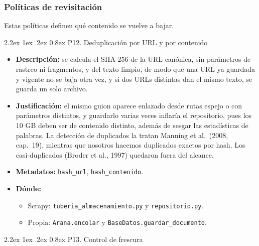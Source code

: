 \documentclass[11pt,spanish]{article}
\makeatletter
\renewcommand\paragraph{\@startsection{paragraph}{4}{\z@}%
  {2.2ex \@plus1ex \@minus.2ex}%
  {0.8ex}%
  {\normalfont\normalsize\bfseries}}
\makeatother
\begin{document}
\subsubsection{Políticas de revisitación}

Estas políticas definen qué contenido se vuelve a bajar.

\paragraph{P12. Deduplicación por URL y por contenido}

\begin{itemize}[label=\textbullet, leftmargin=*]
    \item \textbf{Descripción:} se calcula el SHA-256 de la URL canónica, sin parámetros de rastreo ni fragmentos, y del texto limpio, de modo que una URL ya guardada y vigente no se baja otra vez, y si dos URLs distintas dan el mismo texto, se guarda un solo archivo.
    \item \textbf{Justificación:} el mismo guion aparece enlazado desde rutas espejo o con parámetros distintos, y guardarlo varias veces inflaría el repositorio, pues los 10 GB deben ser de contenido distinto, además de sesgar las estadísticas de palabras. La detección de duplicados la tratan Manning et al.\ (2008, cap.\ 19), mientras que nosotros hacemos duplicados exactos por hash. Los casi-duplicados (Broder et al., 1997) quedaron fuera del alcance.
    \item \textbf{Metadatos:} \texttt{hash\_url}, \texttt{hash\_contenido}.
    \item \textbf{Dónde:}
    \begin{itemize}[label=--, leftmargin=*]
        \item Scrapy: \texttt{tuberia\_almacenamiento.py} y \texttt{repositorio.py}.
        \item Propia: \texttt{Arana.encolar} y \texttt{BaseDatos.guardar\_documento}.
    \end{itemize}
\end{itemize}

\paragraph{P13. Control de frescura}
\end{document}
